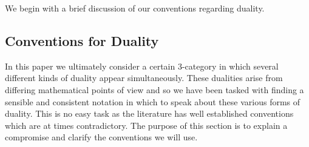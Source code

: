\documentclass{amsart}
\begin{document}
We begin with a brief discussion of our conventions regarding duality.




\subsection{Conventions for Duality}
In this paper we ultimately consider a certain 3-category in which several different kinds of duality appear simultaneously. These dualities arise from differing mathematical points of view and so we have been tasked with finding a sensible and consistent notation in which to speak about these various forms of duality. This is no easy task as the literature has well established conventions which are at times contradictory.  The purpose of this section is to explain a compromise and clarify the conventions we will use.
\end{document}
